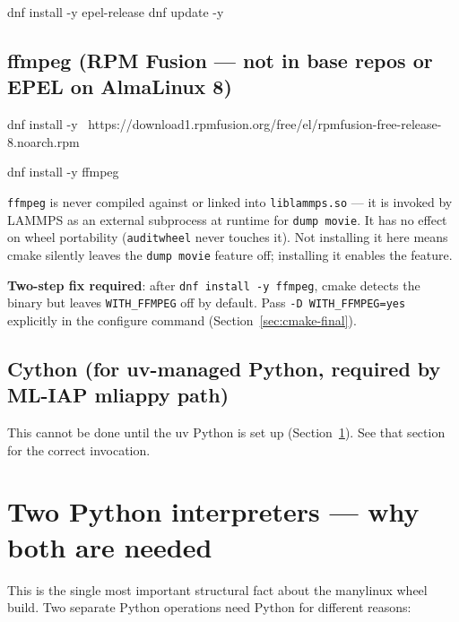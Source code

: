 \documentclass[11pt]{article}
\begin{document}
\begin{codebox}
dnf install -y epel-release
dnf update -y
\end{codebox}

\subsection{ffmpeg (RPM Fusion --- not in base repos or EPEL on AlmaLinux 8)}
\label{subsec:ffmpeg-install}

\begin{codebox}
dnf install -y \
    https://download1.rpmfusion.org/free/el/rpmfusion-free-release-8.noarch.rpm

dnf install -y ffmpeg
\end{codebox}

\texttt{ffmpeg} is never compiled against or linked into \texttt{liblammps.so}
--- it is invoked by LAMMPS as an external subprocess at runtime for
\texttt{dump movie}.  It has no effect on wheel portability (\texttt{auditwheel}
never touches it).  Not installing it here means cmake silently leaves the
\texttt{dump movie} feature off; installing it enables the feature.

\textbf{Two-step fix required}: after \texttt{dnf install -y ffmpeg}, cmake
detects the binary but leaves \texttt{WITH\_FFMPEG} off by default.  Pass
\texttt{-D WITH\_FFMPEG=yes} explicitly in the configure command
(Section~\ref{sec:cmake-final}).

\subsection{Cython (for uv-managed Python, required by ML-IAP mliappy path)}
\label{subsec:cython}

This cannot be done until the uv Python is set up (Section~\ref{sec:two-pythons}).
See that section for the correct invocation.

\section{Two Python interpreters --- why both are needed}
\label{sec:two-pythons}

This is the single most important structural fact about the manylinux wheel
build.  Two separate Python operations need Python for different reasons:
\end{document}
